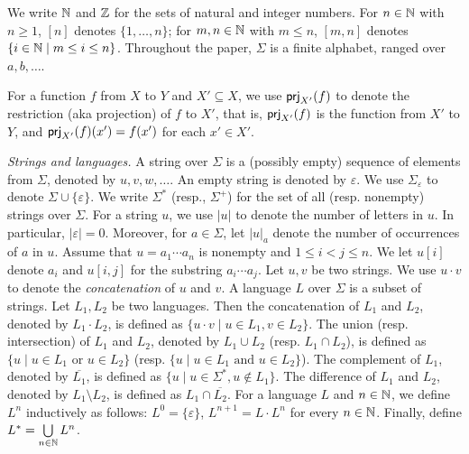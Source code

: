 
We write $\mathbb{N}$ and $\mathbb{Z}$ for the sets of natural and integer numbers. For $n \in \mathbb{N}$ with $n \ge 1$, $[n]$ denotes $\{1, \ldots, n\}$; for $m,n \in \mathbb{N}$ with $m \le n$,  $[m, n]$ denotes $\{ i \in \mathbb{N} \mid m \le i \le n \}$. Throughout the paper, $\Sigma$ is a finite alphabet, ranged over $a,b,\ldots$.  

For a function $f$ from $X$ to $Y$ and $X' \subseteq X$, we use ${\sf prj}_{X'}(f)$ to denote the restriction (aka projection) of $f$ to $X'$, that is, ${\sf prj}_{X'}(f)$ is the function from $X'$ to $Y$, and ${\sf prj}_{X'}(f)(x') = f(x')$ for each $x' \in X'$.

\medskip
\noindent 
\emph{Strings and languages.}
A string over $\Sigma$ is a (possibly empty) sequence of elements from $\Sigma$,
denoted by $u, v, w, \ldots$. An empty string is denoted by $\varepsilon$. We use $\Sigma_\varepsilon$ to denote $\Sigma \cup \{\varepsilon\}$. We write $\Sigma^*$ (resp., $\Sigma^+$) for the set of all (resp. nonempty) strings over $\Sigma$.
For a string $u$, we use $|u|$ to denote the number of letters in $u$. In particular, $|\varepsilon|=0$. 
Moreover, for $a \in \Sigma$, let $|u|_a$ denote the number of occurrences of $a$ in $u$. 
Assume that $u=a_1\cdots a_{n}$ is nonempty and $1\leq i<j \leq n$. 
We let $u[i]$ denote $a_i$ and $u[i,j]$ for the substring 
$a_i\cdots a_j$. 
%
Let $u, v$ be two strings. We use $u \cdot v$ to denote the \emph{concatenation} of $u$ and $v$. A language $L$ over $\Sigma$ is a subset of strings.  
Let $L_1, L_2$ be two languages. Then the concatenation of $L_1$ and $L_2$, denoted by $L_1 \cdot L_2$,  is defined as $\{u \cdot v \mid u \in L_1, v \in L_2\}$. The union (resp. intersection) of $L_1$ and $L_2$, denoted by $L_1 \cup L_2$  (resp. $L_1 \cap L_2$), is defined as $\{u \mid u \in L_1 \mbox{ or } u \in L_2\}$ (resp. $\{u \mid u \in L_1 \mbox{ and } u \in L_2\}$). The complement of $L_1$, denoted by $\overline{L_1}$, is defined as $\{u \mid u \in \Sigma^*, u \not \in L_1\}$. 
The difference of $L_1$ and $L_2$, denoted by $L_1 \setminus L_2$, is defined as $L_1 \cap \overline{L_2}$. 
For a language $L$ and $n \in \mathbb{N}$, we define $L^n$ inductively as follows: $L^0= \{\varepsilon\}$, $L^{n+1} = L \cdot L^n$ for every $n \in \mathbb{N}$. 
Finally, define $L^* = \bigcup \limits_{n \in \mathbb{N}} L^n$.

